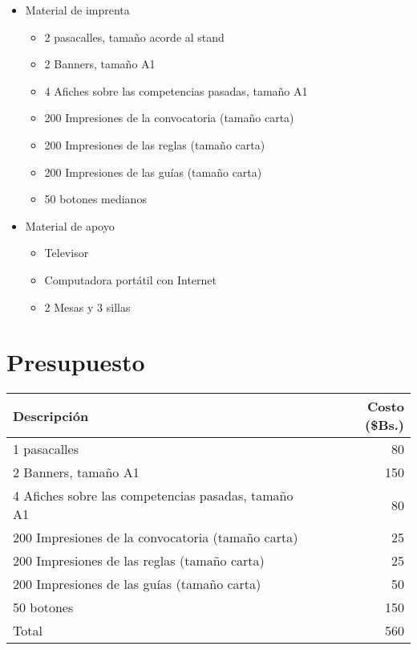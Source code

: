 \documentclass{article}
\begin{document}
\begin{itemize}
\item Material de imprenta
\begin{itemize}
\item 2 pasacalles, tamaño acorde al stand
\item 2 Banners, tamaño A1
\item 4 Afiches sobre las competencias pasadas, tamaño A1
\item 200 Impresiones de la convocatoria (tamaño carta)
\item 200 Impresiones de las reglas (tamaño carta)
\item 200 Impresiones de las guías (tamaño carta)
\item 50 botones medianos
\end{itemize}
\item Material de apoyo
\begin{itemize}
\item Televisor
\item Computadora portátil con Internet
\item 2 Mesas y 3 sillas
\end{itemize}
\end{itemize}


\section{Presupuesto}

\begin{tabular}{lr}
\hline
Descripción  & Costo (\$Bs.)\\
\hline
1 pasacalles & 80 \\
2 Banners, tamaño A1 & 150\\
4 Afiches sobre las competencias pasadas, tamaño A1 & 80\\
200 Impresiones de la convocatoria (tamaño carta) & 25\\
200 Impresiones de las reglas (tamaño carta) & 25\\
200 Impresiones de las guías (tamaño carta) & 50\\
50 botones & 150 \\
\hline
Total & 560 \\
\hline
\end{tabular}
\end{document}
